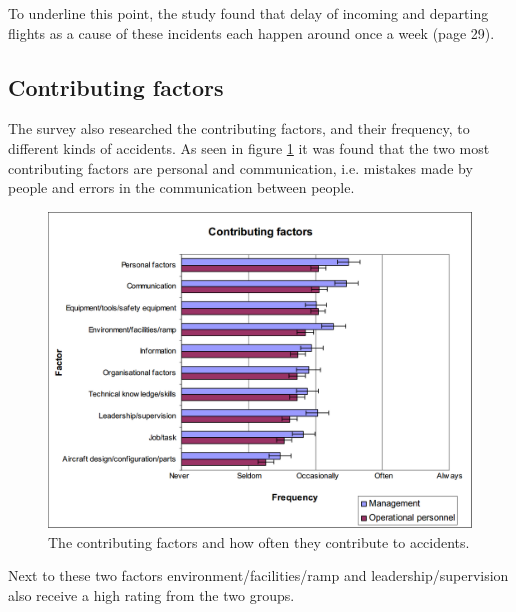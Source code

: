 To underline this point, the study found that delay of incoming and departing flights as a cause of these incidents each happen around once a week (page 29).

\subsection{Contributing factors} %
The survey also researched the contributing factors, and their frequency, to different kinds of accidents. As seen in figure \ref{ContributingFactors} it was found that the two most contributing factors are personal and communication, i.e. mistakes made by people and errors in the communication between people.

\begin{figure}[H]
\centering
\includegraphics[width=\textwidth]{Grafik/ContributingFactors}
\caption{The contributing factors and how often they contribute to accidents.}
\label{ContributingFactors}
\end{figure}

Next to these two factors environment/facilities/ramp and leadership/supervision also receive a high rating from the two groups. 

\newpage
